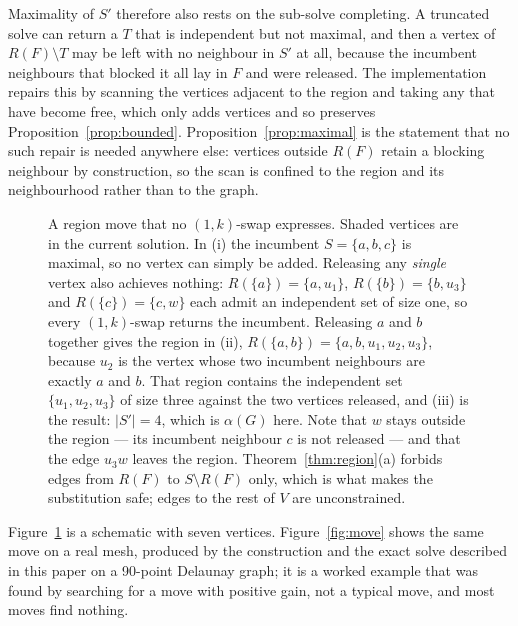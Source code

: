 \documentclass[review,authoryear,11pt]{elsarticle}
\theoremstyle{definition}
\begin{document}
Maximality of $S'$ therefore also rests on the sub-solve completing. A truncated
solve can return a $T$ that is independent but not maximal, and then a vertex of
$R(F) \setminus T$ may be left with no neighbour in $S'$ at all, because the
incumbent neighbours that blocked it all lay in $F$ and were released. The
implementation repairs this by scanning the vertices adjacent to the region and
taking any that have become free, which only adds vertices and so preserves
Proposition~\ref{prop:bounded}. Proposition~\ref{prop:maximal} is the statement
that no such repair is needed anywhere else: vertices outside $R(F)$ retain a
blocking neighbour by construction, so the scan is confined to the region and its
neighbourhood rather than to the graph.

\begin{figure}[htbp]
\centering
\resizebox{\textwidth}{!}{}
\caption{A region move that no $(1,k)$-swap expresses. Shaded
vertices are in the current solution. In (i) the incumbent $S=\{a,b,c\}$ is
maximal, so no vertex can simply be added. Releasing any \emph{single} vertex
also achieves nothing: $R(\{a\})=\{a,u_1\}$, $R(\{b\})=\{b,u_3\}$ and
$R(\{c\})=\{c,w\}$ each admit an independent set of size one, so every
$(1,k)$-swap returns the incumbent. Releasing $a$ and $b$ together gives the
region in (ii), $R(\{a,b\})=\{a,b,u_1,u_2,u_3\}$, because $u_2$ is the vertex
whose two incumbent neighbours are exactly $a$ and $b$. That region contains the
independent set $\{u_1,u_2,u_3\}$ of size three against the two vertices
released, and (iii) is the result: $|S'|=4$, which is $\alpha(G)$ here. Note that
$w$ stays outside the region --- its incumbent neighbour $c$ is not released ---
and that the edge $u_3w$ leaves the region. Theorem~\ref{thm:region}(a) forbids
edges from $R(F)$ to $S \setminus R(F)$ only, which is what makes the
substitution safe; edges to the rest of $V$ are unconstrained.}
\label{fig:region}
\end{figure}

Figure~\ref{fig:region} is a schematic with seven vertices. Figure~\ref{fig:move}
shows the same move on a real mesh, produced by the construction and the exact
solve described in this paper on a 90-point Delaunay graph; it is a worked example
that was found by searching for a move with positive gain, not a typical move,
and most moves find nothing.
\end{document}
